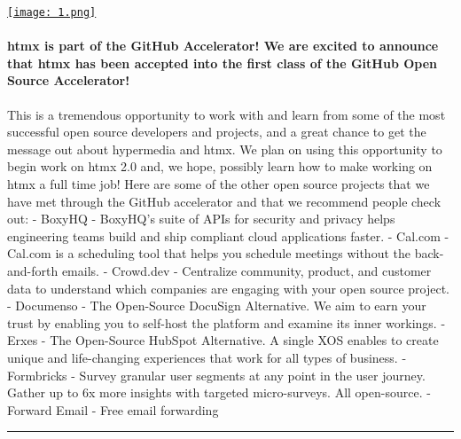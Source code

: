 \documentclass[10pt,a4paper]{article}
\begin{document}
\begin{minipage}[t]{0.80\linewidth}
\vspace{0pt}
\begin{multicols}{2}

    \href{https://htmx.org/posts/2023-06-06-htmx-github-accelerator/?utm\_source=hackernewsletter\&utm\_medium=email\&utm\_term=fav}{
        \texttt{[image: 1.png]}
    }
  
\paragraph{htmx is part of the GitHub Accelerator!
We are excited to announce that htmx has been accepted into the first class of the
GitHub Open Source Accelerator!}
 This is a tremendous opportunity to work with and
learn from some of the most successful open source developers and projects, and a great chance to get the message
out about hypermedia and htmx.
We plan on using this opportunity to begin work on htmx 2.0 and, we hope, possibly learn how to make working on htmx
a full time job!
Here are some of the other open source projects that we have met through the GitHub accelerator and that we recommend
people check out:
- BoxyHQ - BoxyHQ’s suite of APIs for security and privacy helps engineering teams build and ship compliant cloud applications faster.
- Cal.com - Cal.com is a scheduling tool that helps you schedule meetings without the back-and-forth emails.
- Crowd.dev - Centralize community, product, and customer data to understand which companies are engaging with your open source project.
- Documenso - The Open-Source DocuSign Alternative. We aim to earn your trust by enabling you to self-host the platform and examine its inner workings.
- Erxes - The Open-Source HubSpot Alternative. A single XOS enables to create unique and life-changing experiences that work for all types of business.
- Formbricks - Survey granular user segments at any point in the user journey. Gather up to 6x more insights with targeted micro-surveys. All open-source.
- Forward Email - Free email forwarding 

\end{multicols}
\end{minipage}
\par\medskip
\noindent\textcolor{red}{\rule{\linewidth}{0.2mm}}
\end{document}
